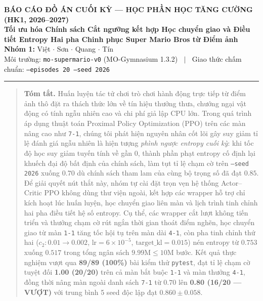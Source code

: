 \documentclass[a4paper,10pt]{article}
\begin{document}
\thispagestyle{empty}

\begin{center}
  {\small\sffamily\bfseries\color{AccentBlue} BÁO CÁO ĐỒ ÁN CUỐI KỲ --- HỌC PHẦN HỌC TĂNG CƯỜNG (HK1, 2026--2027)}\\[4pt]
  {\Large\bfseries\color{DarkText} Tối ưu hóa Chính sách Cắt ngưỡng kết hợp Học chuyển giao và Điều tiết Entropy Hai pha Chinh phục Super Mario Bros từ Điểm ảnh}\\[5pt]
  {\normalsize \textbf{Nhóm 1:} Việt $\cdot$ Sơn $\cdot$ Quang $\cdot$ Tín}\\[2pt]
  {\footnotesize\color{MutedGray} Môi trường: \texttt{mo-supermario-v0} (MO-Gymnasium 1.3.2) $\;\mid\;$ Giao thức chấm chuẩn: \texttt{--episodes 20 --seed 2026}}
\end{center}
\noindent\rule{\linewidth}{0.8pt}

\begin{quote}
\small
\noindent\textbf{Tóm tắt.} Huấn luyện tác tử chơi trò chơi hành động trực tiếp từ điểm ảnh thô đặt ra thách thức lớn về tín hiệu thưởng thưa, chướng ngại vật động có tính ngẫu nhiên cao và chi phí giả lập CPU lớn. Trong quá trình áp dụng thuật toán Proximal Policy Optimization (PPO) trên các màn nâng cao như \texttt{7-1}, chúng tôi phát hiện nguyên nhân cốt lõi gây suy giảm tỉ lệ đánh giá ngẫu nhiên là hiện tượng \emph{phình ngược entropy cuối kỳ}: khi tốc độ học suy giảm tuyến tính về gần $0$, thành phần phạt entropy cố định lại khuếch đại độ bất định của chính sách, làm tụt tỉ lệ chạm cờ trên \texttt{--seed 2026} xuống $0.70$ dù chính sách tham lam của cùng bộ trọng số đã đạt $0.85$. Để giải quyết nút thắt này, nhóm tự cài đặt trọn vẹn hệ thống Actor--Critic PPO không dùng thư viện ngoài, kết hợp các wrapper hỗ trợ chỉ kích hoạt lúc huấn luyện, học chuyển giao liên màn và lịch trình tinh chỉnh hai pha điều tiết hệ số entropy. Cụ thể, các wrapper cắt lượt không tiến triển và thưởng chạm cờ rút ngắn thời gian thoát điểm nghẽn, học chuyển giao từ màn \texttt{1-1} tăng tốc hội tụ trên màn dài \texttt{4-1}, còn pha tinh chỉnh thứ hai ($c_2: 0.01 \to 0.002$, $\text{lr} = 6\times 10^{-5}$, $\text{target\_kl} = 0.015$) nén entropy từ $0.753$ xuống $0.517$ trong tổng ngân sách $9.99\text{M} \le 10\text{M}$ bước. Kết quả thực nghiệm vượt qua \textbf{89/89 (100\%)} bài kiểm thử \texttt{pytest}, đạt tỉ lệ chạm cờ tuyệt đối \textbf{1.00 (20/20)} trên cả màn bắt buộc \texttt{1-1} và màn thưởng \texttt{4-1}, đồng thời nâng màn ngoài danh sách \texttt{7-1} từ $0.70$ lên \textbf{0.80 (16/20 --- VƯỢT)} với trung bình 5 seed độc lập đạt $\mathbf{0.860 \pm 0.058}$.
\end{quote}
\end{document}
